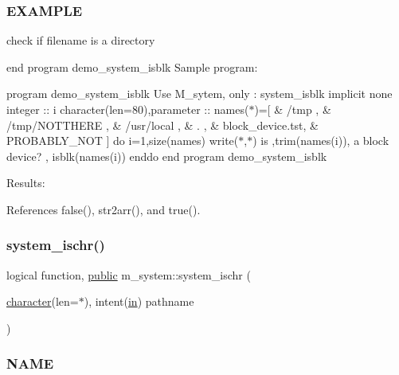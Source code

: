 \subsubsection*{E\+X\+A\+M\+P\+LE}

check if filename is a directory

end program demo\+\_\+system\+\_\+isblk Sample program\+:

program demo\+\_\+system\+\_\+isblk Use M\+\_\+sytem, only \+: system\+\_\+isblk implicit none integer \+:\+: i character(len=80),parameter \+:\+: names($\ast$)=\mbox{[} \& \textquotesingle{}/tmp \textquotesingle{}, \& \textquotesingle{}/tmp/\+N\+O\+T\+T\+H\+E\+RE \textquotesingle{}, \& \textquotesingle{}/usr/local \textquotesingle{}, \& \textquotesingle{}. \textquotesingle{}, \& \textquotesingle{}block\+\_\+device.\+tst\textquotesingle{}, \& \textquotesingle{}P\+R\+O\+B\+A\+B\+L\+Y\+\_\+\+N\+OT \textquotesingle{}\mbox{]} do i=1,size(names) write($\ast$,$\ast$)\textquotesingle{} is \textquotesingle{},trim(names(i)),\textquotesingle{} a block device? \textquotesingle{}, isblk(names(i)) enddo end program demo\+\_\+system\+\_\+isblk

Results\+: 

References false(), str2arr(), and true().

\mbox{\label{namespacem__system_a12a948fa4aacda084a538ae3a5ae3cc6}} 
\subsubsection{\texorpdfstring{system\+\_\+ischr()}{system\_ischr()}}
{\footnotesize\ttfamily logical function, \hyperlink{M__stopwatch_83_8txt_a2f74811300c361e53b430611a7d1769f}{public} m\+\_\+system\+::system\+\_\+ischr (\begin{DoxyParamCaption}\item[{\hyperlink{option__stopwatch_83_8txt_abd4b21fbbd175834027b5224bfe97e66}{character}(len=$\ast$), intent(\hyperlink{M__journal_83_8txt_afce72651d1eed785a2132bee863b2f38}{in})}]{pathname }\end{DoxyParamCaption})}



\subsubsection*{N\+A\+ME}

